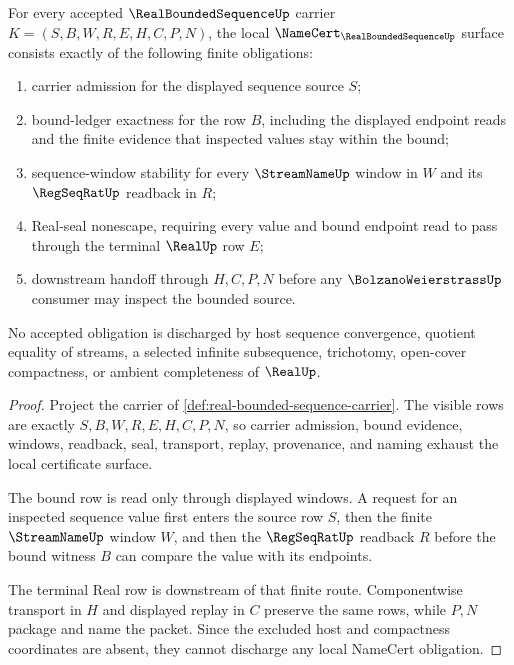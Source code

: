\begin{theorem}
\label{thm:real-bounded-sequence-namecert-obligations}
For every accepted $\RealBoundedSequenceUp$ carrier $K=(S,B,W,R,E,H,C,P,N)$, the local $\NameCert_{\RealBoundedSequenceUp}$ surface consists exactly of the following finite obligations:
\begin{enumerate}
\item carrier admission for the displayed sequence source $S$;
\item bound-ledger exactness for the row $B$, including the displayed endpoint reads and the finite evidence that inspected values stay within the bound;
\item sequence-window stability for every $\StreamNameUp$ window in $W$ and its $\RegSeqRatUp$ readback in $R$;
\item Real-seal nonescape, requiring every value and bound endpoint read to pass through the terminal $\RealUp$ row $E$;
\item downstream handoff through $H,C,P,N$ before any $\BolzanoWeierstrassUp$ consumer may inspect the bounded source.
\end{enumerate}
No accepted obligation is discharged by host sequence convergence, quotient equality of streams, a selected infinite subsequence, trichotomy, open-cover compactness, or ambient completeness of $\RealUp$.
\end{theorem}
\begin{proof}
Project the carrier of \autoref{def:real-bounded-sequence-carrier}. The visible rows are exactly $S,B,W,R,E,H,C,P,N$, so carrier admission, bound evidence, windows, readback, seal, transport, replay, provenance, and naming exhaust the local certificate surface.

The bound row is read only through displayed windows. A request for an inspected sequence value first enters the source row $S$, then the finite $\StreamNameUp$ window $W$, and then the $\RegSeqRatUp$ readback $R$ before the bound witness $B$ can compare the value with its endpoints.

The terminal Real row is downstream of that finite route. Componentwise transport in $H$ and displayed replay in $C$ preserve the same rows, while $P,N$ package and name the packet. Since the excluded host and compactness coordinates are absent, they cannot discharge any local NameCert obligation.
\end{proof}

